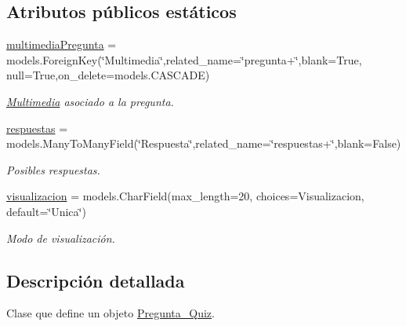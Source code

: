 \subsection*{Atributos públicos estáticos}
\begin{DoxyCompactItemize}
\item 
\hyperlink{classappEmotionIOT_1_1models_1_1Pregunta__Quiz_a40ccf8403b26e89719808ccbf2435758}{multimedia\+Pregunta} = models.\+Foreign\+Key(\char`\"{}Multimedia\char`\"{},related\+\_\+name=\char`\"{}pregunta+\char`\"{},blank=True, null=True,on\+\_\+delete=models.\+C\+A\+S\+C\+A\+DE)\hypertarget{classappEmotionIOT_1_1models_1_1Pregunta__Quiz_a40ccf8403b26e89719808ccbf2435758}{}\label{classappEmotionIOT_1_1models_1_1Pregunta__Quiz_a40ccf8403b26e89719808ccbf2435758}

\begin{DoxyCompactList}\small\item\em \hyperlink{classappEmotionIOT_1_1models_1_1Multimedia}{Multimedia} asociado a la pregunta. \end{DoxyCompactList}\item 
\hyperlink{classappEmotionIOT_1_1models_1_1Pregunta__Quiz_ad0b6f309ae105b77dfc267c16cc3edfa}{respuestas} = models.\+Many\+To\+Many\+Field(\char`\"{}Respuesta\char`\"{},related\+\_\+name=\char`\"{}respuestas+\char`\"{},blank=False)\hypertarget{classappEmotionIOT_1_1models_1_1Pregunta__Quiz_ad0b6f309ae105b77dfc267c16cc3edfa}{}\label{classappEmotionIOT_1_1models_1_1Pregunta__Quiz_ad0b6f309ae105b77dfc267c16cc3edfa}

\begin{DoxyCompactList}\small\item\em Posibles respuestas. \end{DoxyCompactList}\item 
\hyperlink{classappEmotionIOT_1_1models_1_1Pregunta__Quiz_ac8d7a303878870c0674663dbce4b3c28}{visualizacion} = models.\+Char\+Field(max\+\_\+length=20, choices=Visualizacion, default=\char`\"{}Unica\char`\"{})\hypertarget{classappEmotionIOT_1_1models_1_1Pregunta__Quiz_ac8d7a303878870c0674663dbce4b3c28}{}\label{classappEmotionIOT_1_1models_1_1Pregunta__Quiz_ac8d7a303878870c0674663dbce4b3c28}

\begin{DoxyCompactList}\small\item\em Modo de visualización. \end{DoxyCompactList}\end{DoxyCompactItemize}


\subsection{Descripción detallada}
Clase que define un objeto \hyperlink{classappEmotionIOT_1_1models_1_1Pregunta__Quiz}{Pregunta\+\_\+\+Quiz}. 


